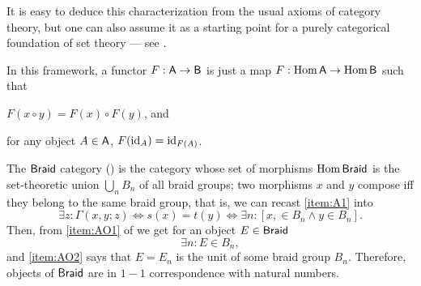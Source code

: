 It is easy to deduce this characterization from the usual axioms of
category theory, but one can also assume it as a starting point for a
purely categorical foundation of set theory --- see
\cite{lawvere;1965}. 

In this framework, a functor $F: \mathsf{A} \to \mathsf{B}$ is just a map $F:
\operatorname{Hom}\mathsf{A} \to \operatorname{Hom}\mathsf{B}$ such that
\begin{inparaenum}
\item $F(x \circ y) = F(x) \circ F(y)$, and
\item for any object $A \in \mathsf{A}$, $F(\operatorname{id}_A) = \operatorname{id}_{F(A)}$.
\end{inparaenum}

\begin{example}\label{xmp:braid-by-arrows}
  The $\mathsf{Braid}$ category () is the category whose
  set of morphisms $\operatorname{Hom}\mathsf{Braid}$ is the set-theoretic union $\bigcup_n
  B_n$ of all braid groups; two morphisms $x$ and $y$ compose iff they
  belong to the same braid group, that is, we can recast \ref{item:A1}
  into
  \begin{equation*}
    \exists z: \Gamma(x,y;z) \Leftrightarrow s(x) = t(y) \Leftrightarrow \exists n: [x, \in B_n \land y \in B_n].
  \end{equation*}
  Then, from \ref{item:AO1} of  we get for an object
  $E \in \mathsf{Braid}$
  \begin{equation*}
    \exists n: E \in B_n,
  \end{equation*}
  and \ref{item:AO2} says that $E = E_n$ is the unit of some braid group
  $B_n$. Therefore, objects of $\mathsf{Braid}$ are in $1-1$ correspondence
  with natural numbers.
\end{example}

